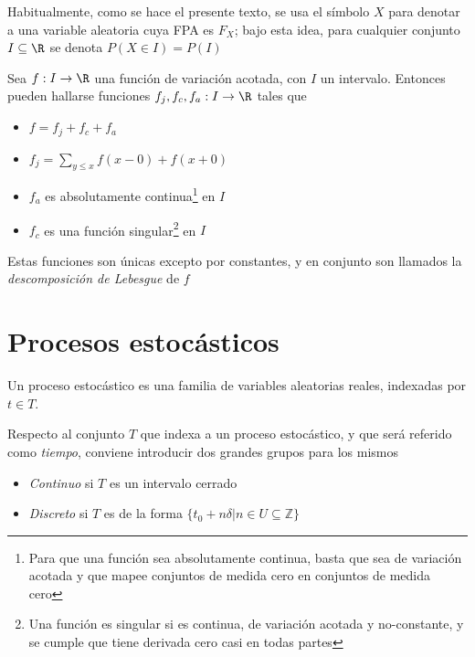 Habitualmente, como se hace el presente texto, se usa el símbolo $X$ para denotar a una variable 
aleatoria cuya FPA es $F_X$; bajo esta idea, para cualquier conjunto $I \subseteq \R$ se denota
$P(X \in I) = P(I)$



\begin{teorema}
Sea $f:I\rightarrow \R$ una función de variación acotada, con $I$ un intervalo. Entonces pueden 
hallarse funciones $f_j, f_c, f_a :I\rightarrow \R$ tales que
\begin{itemize}
\item $f = f_j+ f_c+ f_a$
\item $f_j = \sum_{y \leq x} f(x-0) + f(x+0)$
\item $f_a$ es absolutamente continua\footnote{Para que una función sea absolutamente continua,
basta que sea de variación acotada y que mapee conjuntos de medida cero en conjuntos de medida
cero} en $I$
\item $f_c$ es una función singular\footnote{Una función es singular si es continua, de 
variación acotada y no-constante, y se cumple que tiene derivada cero casi en todas partes} en 
$I$
\end{itemize}
Estas funciones son únicas excepto por constantes, y en conjunto son llamados la 
\textit{descomposición de Lebesgue} de $f$
\label{Lebesgue_decomp}
\end{teorema}


\section{Procesos estocásticos}

\begin{definicion}
Un proceso estocástico \xt es una familia de variables aleatorias reales, 
indexadas por $t \in T$.
\label{proc_estocastico}
\end{definicion}

Respecto al conjunto $T$ que indexa a un proceso estocástico, y que será referido como 
\textit{tiempo}, conviene introducir dos grandes grupos para los mismos
\begin{itemize}
\item \textit{Continuo} si $T$ es un intervalo cerrado
\item \textit{Discreto} si $T$ es de la forma 
$\{ t_0 + n \delta \lvert n \in U \subseteq \mathbb{Z} \}$
\end{itemize}

